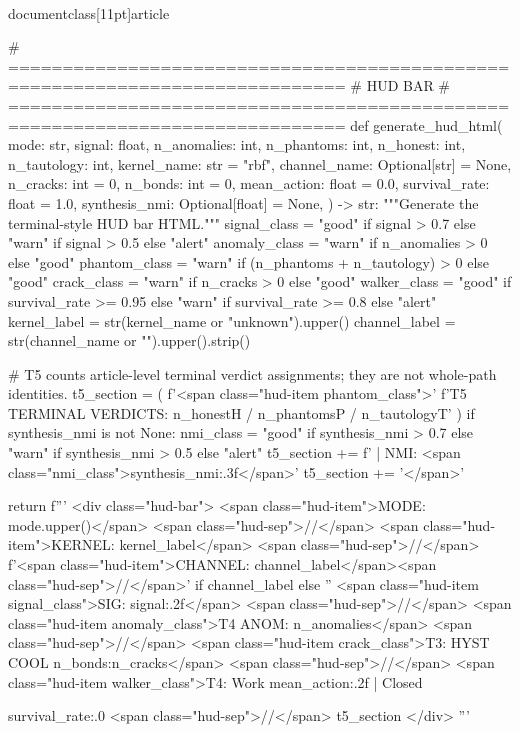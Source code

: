 \\documentclass[11pt]{article}
\begin{document}
\begin{CodeBlock}
{{{# =============================================================================
# HUD BAR
# =============================================================================
def generate_hud_html(
    mode: str,
    signal: float,
    n_anomalies: int,
    n_phantoms: int,
    n_honest: int,
    n_tautology: int,
    kernel_name: str = "rbf",
    channel_name: Optional[str] = None,
    n_cracks: int = 0,
    n_bonds: int = 0,
    mean_action: float = 0.0,
    survival_rate: float = 1.0,
    synthesis_nmi: Optional[float] = None,
) -> str:
    """Generate the terminal-style HUD bar HTML."""
    signal_class = "good" if signal > 0.7 else "warn" if signal > 0.5 else "alert"
    anomaly_class = "warn" if n_anomalies > 0 else "good"
    phantom_class = "warn" if (n_phantoms + n_tautology) > 0 else "good"
    crack_class = "warn" if n_cracks > 0 else "good"
    walker_class = "good" if survival_rate >= 0.95 else "warn" if survival_rate >= 0.8 else "alert"
    kernel_label = str(kernel_name or "unknown").upper()
    channel_label = str(channel_name or "").upper().strip()

    # T5 counts article-level terminal verdict assignments; they are not whole-path identities.
    t5_section = (
        f'<span class="hud-item {phantom_class}">'
        f'T5 TERMINAL VERDICTS: {n_honest}H / {n_phantoms}P / {n_tautology}T'
    )
    if synthesis_nmi is not None:
        nmi_class = "good" if synthesis_nmi > 0.7 else "warn" if synthesis_nmi > 0.5 else "alert"
        t5_section += f' | NMI: <span class="{nmi_class}">{synthesis_nmi:.3f}</span>'
    t5_section += '</span>'

    return f'''
    <div class="hud-bar">
        <span class="hud-item">MODE: {mode.upper()}</span>
        <span class="hud-sep">//</span>
        <span class="hud-item">KERNEL: {kernel_label}</span>
        <span class="hud-sep">//</span>
        {f'<span class="hud-item">CHANNEL: {channel_label}</span><span class="hud-sep">//</span>' if channel_label else ''}
        <span class="hud-item {signal_class}">SIG: {signal:.2f}</span>
        <span class="hud-sep">//</span>
        <span class="hud-item {anomaly_class}">T4 ANOM: {n_anomalies}</span>
        <span class="hud-sep">//</span>
        <span class="hud-item {crack_class}">T3: HYST COOL {n_bonds}:{n_cracks}</span>
        <span class="hud-sep">//</span>
        <span class="hud-item {walker_class}">T4: Work {mean_action:.2f} | Closed {survival_rate:.0%
        <span class="hud-sep">//</span>
        {t5_section}
    </div>
    '''


}}}}
\end{CodeBlock}
\end{document}
